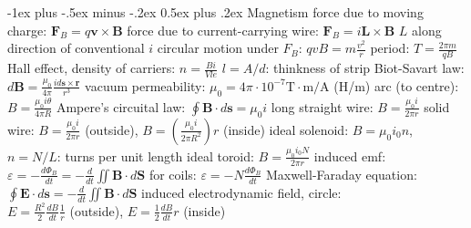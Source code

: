\documentclass[10pt,landscape]{article}
\makeatletter
\renewcommand{\subsection}{\@startsection{subsection}{2}{0mm}%
                                {-1ex plus -.5ex minus -.2ex}%
                                {0.5ex plus .2ex}%
                                {\normalfont\normalsize\bfseries}}
\newcommand{\spc}{\hspace*{1em}}
\makeatother
\begin{document}
\begin{multicols}{3}
\subsection{Magnetism}
force due to moving charge: $\mathbf{F}_B=q\mathbf{v}\times \mathbf{B}$
\newline
force due to current-carrying wire: $\mathbf{F}_B=i\mathbf{L}\times \mathbf{B}$ \newline
\spc $L$ along direction of conventional $i$
\newline
circular motion under $F_B$: $qvB=m\frac{v^2}{r}$
\newline
\spc period: $T=\frac{2\pi m}{qB}$
\newline
Hall effect, density of carriers: $n=\frac{Bi}{Vle}$
\newline
\spc $l=A/d$: thinkness of strip
\newline
Biot-Savart law: $d\mathbf{B}=\frac{\mu _0}{4\pi }\frac{id\mathbf{s\times \mathbf{r}}}{r^3}$
\newline
vacuum permeability: $\mu_0=4\pi\cdot10^{-7}\textrm{T}\cdot \textrm{m}/\textrm{A}$ (H/m)
\newline
\spc arc (to centre): $B=\frac{\mu _0i\theta }{4\pi R}$
\newline \newline
Ampere's circuital law: $\oint \mathbf{B}\cdot d\mathbf{s}=\mu _0i$
\newline
\spc long straight wire: $B=\frac{\mu _0i}{2\pi r}$
\newline
\spc solid wire: $B=\frac{\mu _0i}{2\pi r}$ (outside), $B=(\frac{\mu _0i}{2\pi R^2})r$ (inside)
\newline
\spc ideal solenoid: $B=\mu _0i_0n$, $n=N/L$: turns per unit length
\newline
\spc ideal toroid: $B=\frac{\mu _0i_0N}{2\pi r}$
\newline \newline
induced emf: $\varepsilon =-\frac{d\Phi _B}{dt}=-\frac{d}{dt} \iint \mathbf{B} \cdot d\mathbf{S}$
\newline
\spc for coils: $\varepsilon =-N\frac{d\Phi _B}{dt}$
\newline
Maxwell-Faraday equation: $\oint \mathbf{E}\cdot d\mathbf{s}=-\frac{d}{dt} \iint \mathbf{B}\cdot d\mathbf{S}$
\newline
\spc induced electrodynamic field, circle:
\\\spc$E=\frac{R^2}{2}\frac{dB}{dt}\frac{1}{r}$ (outside), $E=\frac{1}{2}\frac{dB}{dt}r$ (inside)


\end{multicols}
\end{document}
